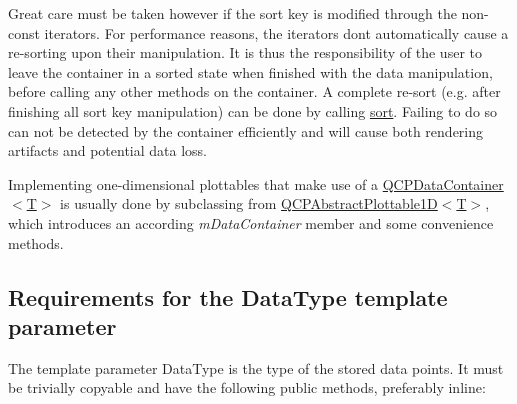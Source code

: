 Great care must be taken however if the sort key is modified through the non-\/const iterators. For performance reasons, the iterators don\textquotesingle{}t automatically cause a re-\/sorting upon their manipulation. It is thus the responsibility of the user to leave the container in a sorted state when finished with the data manipulation, before calling any other methods on the container. A complete re-\/sort (e.\+g. after finishing all sort key manipulation) can be done by calling \hyperlink{classQCPDataContainer_a75da92e33063b63d6da5014683591d45}{sort}. Failing to do so can not be detected by the container efficiently and will cause both rendering artifacts and potential data loss.

Implementing one-\/dimensional plottables that make use of a \hyperlink{classQCPDataContainer}{Q\+C\+P\+Data\+Container$<$\+T$>$} is usually done by subclassing from \hyperlink{classQCPAbstractPlottable1D}{Q\+C\+P\+Abstract\+Plottable1D$<$T$>$}, which introduces an according {\itshape m\+Data\+Container} member and some convenience methods.\hypertarget{classQCPDataContainer_qcpdatacontainer-datatype}{}\subsection{Requirements for the Data\+Type template parameter}\label{classQCPDataContainer_qcpdatacontainer-datatype}
The template parameter {\ttfamily Data\+Type} is the type of the stored data points. It must be trivially copyable and have the following public methods, preferably inline\+:

